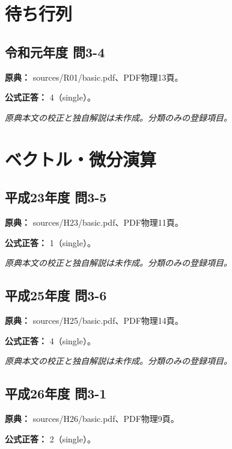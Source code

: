 \section{待ち行列}

\subsection{令和元年度 問3-4}
\label{q:r01-reg-basic-3-4}

\noindent\textbf{原典：} sources/R01/basic.pdf、PDF物理13頁。

\textbf{公式正答：} 4（single）。

\par\textit{原典本文の校正と独自解説は未作成。分類のみの登録項目。}

\section{ベクトル・微分演算}

\subsection{平成23年度 問3-5}
\label{q:h23-reg-basic-3-5}

\noindent\textbf{原典：} sources/H23/basic.pdf、PDF物理11頁。

\textbf{公式正答：} 1（single）。

\par\textit{原典本文の校正と独自解説は未作成。分類のみの登録項目。}

\subsection{平成25年度 問3-6}
\label{q:h25-reg-basic-3-6}

\noindent\textbf{原典：} sources/H25/basic.pdf、PDF物理14頁。

\textbf{公式正答：} 4（single）。

\par\textit{原典本文の校正と独自解説は未作成。分類のみの登録項目。}

\subsection{平成26年度 問3-1}
\label{q:h26-reg-basic-3-1}

\noindent\textbf{原典：} sources/H26/basic.pdf、PDF物理9頁。

\textbf{公式正答：} 2（single）。

